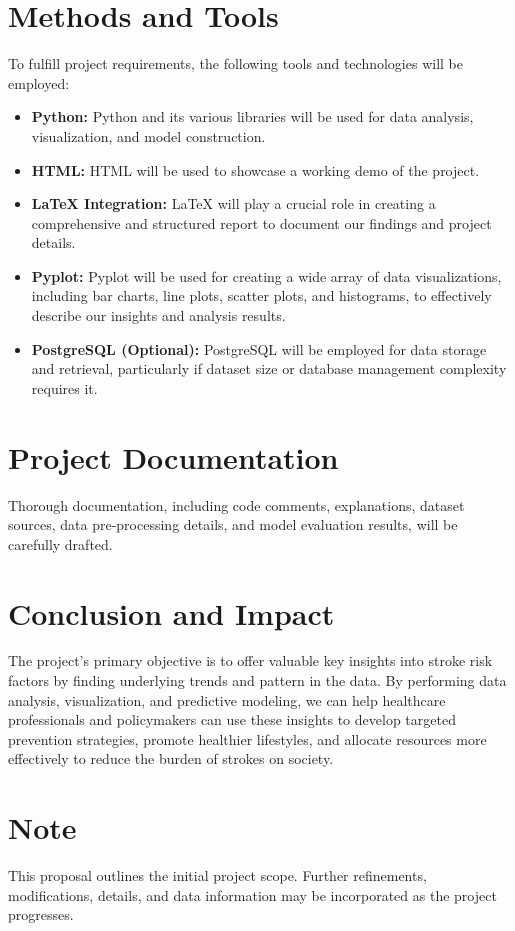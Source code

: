 \documentclass{article}
\begin{document}
\section*{Methods and Tools}
To fulfill project requirements, the following tools and technologies will be employed:

\begin{itemize}
    \item \textbf{Python:} Python and its various libraries will be used for data analysis, visualization, and model construction.
    \item \textbf{HTML:} HTML will be used to showcase a working demo of the project.
    \item \textbf{LaTeX Integration:} LaTeX will play a crucial role in creating a comprehensive and structured report to document our findings and project details.
    \item \textbf{Pyplot:} Pyplot will be used for creating a wide array of data visualizations, including bar charts, line plots, scatter plots, and histograms, to effectively describe our insights and analysis results.
     \item \textbf{PostgreSQL (Optional):} PostgreSQL will be employed for data storage and retrieval, particularly if dataset size or database management complexity requires it.
\end{itemize}

\section*{Project Documentation}
Thorough documentation, including code comments, explanations, dataset sources, data pre-processing details, and model evaluation results, will be carefully drafted.

\section*{Conclusion and Impact}
The project's primary objective is to offer valuable key insights into stroke risk factors by finding underlying trends and pattern in the data. By performing data analysis, visualization, and predictive modeling, we can help healthcare professionals and policymakers can use these insights to develop targeted prevention strategies, promote healthier lifestyles, and allocate resources more effectively to reduce the burden of strokes on society.

\section*{Note}
This proposal outlines the initial project scope. Further refinements, modifications, details, and data information may be incorporated as the project progresses.
\end{document}
